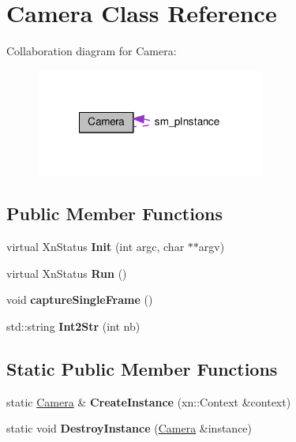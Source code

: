\hypertarget{classCamera}{\section{Camera Class Reference}
\label{classCamera}
}


Collaboration diagram for Camera\-:\nopagebreak
\begin{figure}[H]
\begin{center}
\leavevmode
\includegraphics[width=213pt]{classCamera__coll__graph}
\end{center}
\end{figure}
\subsection*{Public Member Functions}
\begin{DoxyCompactItemize}
\item 
\hypertarget{classCamera_ae9e69218a81d66b322acea65f25557b4}{virtual Xn\-Status {\bfseries Init} (int argc, char $\ast$$\ast$argv)}\label{classCamera_ae9e69218a81d66b322acea65f25557b4}

\item 
\hypertarget{classCamera_a62c47fd66fb241f03a58d3ec6b81e9df}{virtual Xn\-Status {\bfseries Run} ()}\label{classCamera_a62c47fd66fb241f03a58d3ec6b81e9df}

\item 
\hypertarget{classCamera_a97f236804aaa6ff8c866ea7fe80e0e4b}{void {\bfseries capture\-Single\-Frame} ()}\label{classCamera_a97f236804aaa6ff8c866ea7fe80e0e4b}

\item 
\hypertarget{classCamera_afd3c41e39fdd57055223e68761384441}{std\-::string {\bfseries Int2\-Str} (int nb)}\label{classCamera_afd3c41e39fdd57055223e68761384441}

\end{DoxyCompactItemize}
\subsection*{Static Public Member Functions}
\begin{DoxyCompactItemize}
\item 
\hypertarget{classCamera_a1d0965a3b021799350ac21f14ff090f3}{static \hyperlink{classCamera}{Camera} \& {\bfseries Create\-Instance} (xn\-::\-Context \&context)}\label{classCamera_a1d0965a3b021799350ac21f14ff090f3}

\item 
\hypertarget{classCamera_afe0947fe52a6b24186f71459c4f4e1f0}{static void {\bfseries Destroy\-Instance} (\hyperlink{classCamera}{Camera} \&instance)}\label{classCamera_afe0947fe52a6b24186f71459c4f4e1f0}

\end{DoxyCompactItemize}
